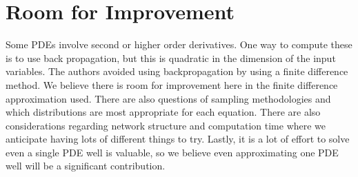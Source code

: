 \documentclass[14pt]{article}
\begin{document}
\section{ Room for Improvement }
Some PDEs involve second or higher order derivatives. One way to compute these is to use back propagation, but this is quadratic in the dimension of the input variables. The authors avoided using backpropagation by using a finite difference method. We believe there is room for improvement here in the finite difference approximation used. There are also questions of sampling methodologies and which distributions are most appropriate for each equation. There are also considerations regarding network structure and computation time where we anticipate having lots of different things to try. Lastly, it is a lot of effort to solve even a single PDE well is valuable, so we believe even approximating one PDE well will be a significant contribution.
\end{document}
